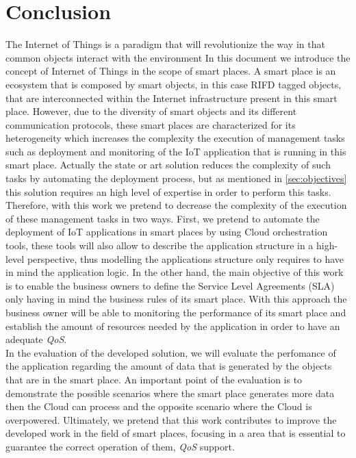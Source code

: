 \section{Conclusion}
\label{sec:conclusion}
The Internet of Things is a paradigm that will revolutionize the way in that common objects interact with the environment
In this document we introduce the concept of Internet of Things in the scope of smart places. A smart place is an ecosystem
that is composed by smart objects, in this case RIFD tagged objects, that are interconnected within the Internet infrastructure present in this smart place.
However, due to the diversity of smart objects and its different communication protocols, these smart places are characterized
for its heterogeneity which increases the complexity the execution of management tasks such as deployment and monitoring of the
IoT application that is running in this smart place. Actually the state or art solution reduces the complexity of such tasks by
automating the deployment process, but as mentioned in \ref{sec:objectives} this solution requires an high level of expertise in
order to perform this tasks.\\

Therefore, with this work we pretend to decrease the complexity of the execution of these management tasks in two ways. First,
we pretend to automate the deployment of IoT applications in smart places by using Cloud orchestration tools, these tools will also
allow to describe the application structure in a high-level perspective, thus modelling the applications structure only requires
to have in mind the application logic. In the other hand, the main objective of this work is to enable the business owners to define
the Service Level Agreements (SLA) only having in mind the business rules of its smart place. With this approach the business owner will
be able to monitoring the performance of its smart place and establish the amount of resources needed by the application in order to
have an adequate \textit{QoS}.\\

In the evaluation of the developed solution, we will evaluate the perfomance of the application regarding the amount of data that is generated by
the objects that are in the smart place. An important point of the evaluation is to demonstrate the possible scenarios where the smart
place generates more data then the Cloud can process and the opposite scenario where the Cloud is overpowered. Ultimately,
we pretend that this work contributes to improve the developed work in the field of smart places, focusing in a area that is essential to guarantee the correct
operation of them, \textit{QoS} support.
